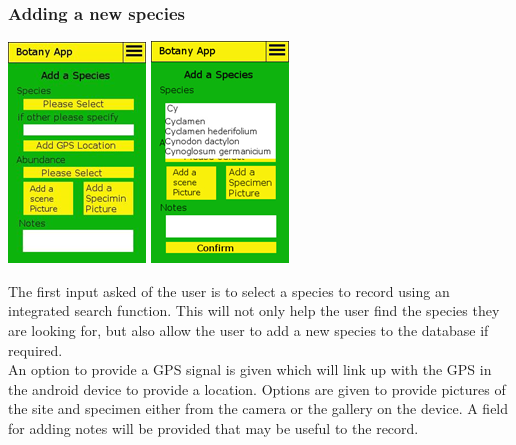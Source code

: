 \documentclass[11pt, titlepage]{article}
\begin{document}
			\subsubsection{Adding a new species}
			\begin{center}
			\includegraphics[scale=1]{res/botanyAppAddSpecies1.png}
			 \includegraphics[scale=1]{res/botanyAppAddSpecies2.png}
			\end{center}
			The first input asked of the user is to select a species to record using an integrated search function. This will not only help the user find the species they are looking for, but also allow the user to add a new species to the database if required.\\
			
			An option to provide a GPS signal is given which will link up with the GPS in the android device to provide a location. Options are given to provide pictures of the site and specimen either from the camera or the gallery on the device. A field for adding notes will be provided that may be useful to the record.\\
			\clearpage
\end{document}
